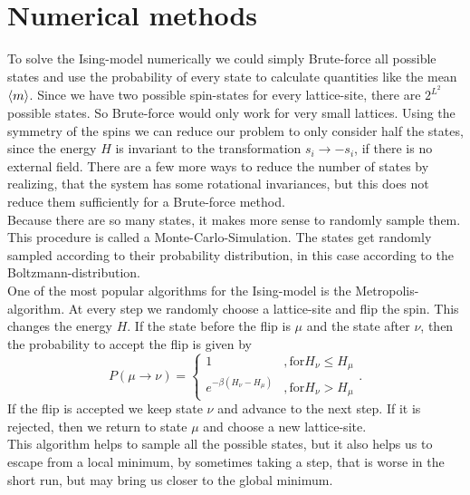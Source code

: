 \section{Numerical methods}
To solve the Ising-model numerically we could simply Brute-force all possible states and use the probability of every state to calculate quantities like the mean $\left\langle m\right\rangle$. Since we have two possible spin-states for every lattice-site, there are $2^{L^2}$ possible states. So Brute-force would only work for very small lattices. Using the symmetry of the spins we can reduce our problem to only consider half the states, since the energy $H$ is invariant to the transformation $s_i \to -s_i$, if there is no external field. There are a few more ways to reduce the number of states by realizing, that the system has some rotational invariances, but this does not reduce them sufficiently for a Brute-force method.\\
Because there are so many states, it makes more sense to randomly sample them. This procedure is called a Monte-Carlo-Simulation. The states get randomly sampled according to their probability distribution, in this case according to the Boltzmann-distribution.\\
One of the most popular algorithms for the Ising-model is the Metropolis-algorithm. At every step we randomly choose a lattice-site and flip the spin. This changes the energy $H$. If the state before the flip is $\mu$ and the state after $\nu$, then the probability to accept the flip is given by
\begin{equation}
  P(\mu \rightarrow \nu) =
  \begin{cases}
    1  &, \text{for} H_{\nu} \leq H_{\mu} \\
    e^{-\beta (H_{\nu} - H_{\mu})} &, \text{for} H_{\nu} > H_{\mu}
  \end{cases}.
\end{equation}
If the flip is accepted we keep state $\nu$ and advance to the next step. If it is rejected, then we return to state $\mu$ and choose a new lattice-site.\\
This algorithm helps to sample all the possible states, but it also helps us to escape from a local minimum, by sometimes taking a step, that is worse in the short run, but may bring us closer to the global minimum.\\

